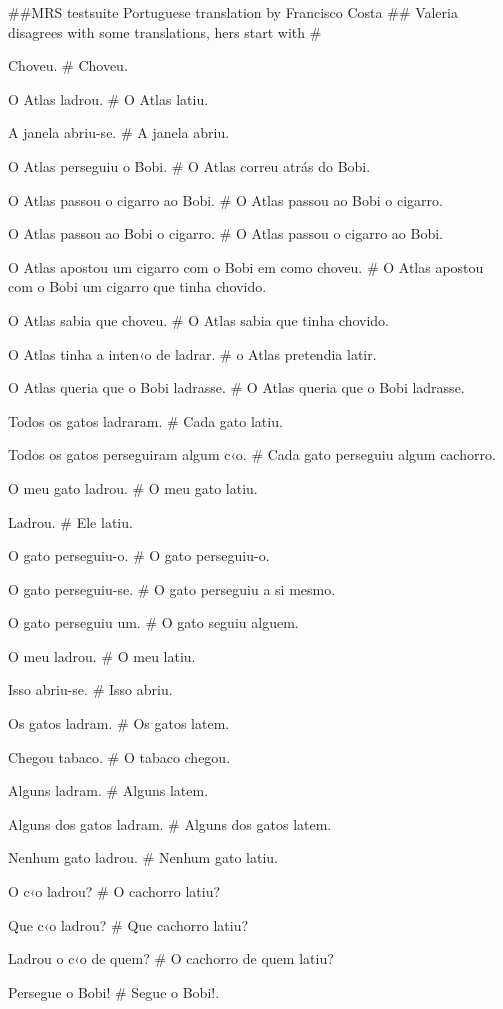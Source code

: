 ##MRS testsuite Portuguese translation by Francisco Costa
## Valeria disagrees with some translations, hers start with #

Choveu.
# Choveu.

O Atlas ladrou.
# O Atlas latiu.

A janela abriu-se.
# A janela abriu.

O Atlas perseguiu o Bobi.
# O Atlas correu atrás do Bobi.

O Atlas passou o cigarro ao Bobi.
# O Atlas passou ao Bobi o cigarro.

O Atlas passou ao Bobi o cigarro.
# O Atlas passou o cigarro ao Bobi.

O Atlas apostou um cigarro com o Bobi em como choveu.
# O Atlas apostou  com o Bobi um cigarro que tinha chovido.

O Atlas sabia que choveu.
# O Atlas sabia que tinha chovido.

O Atlas tinha a inten‹o de ladrar.
# o Atlas pretendia latir.

O Atlas queria que o Bobi ladrasse.
# O Atlas queria que o Bobi ladrasse.

Todos os gatos ladraram.
# Cada gato latiu.

Todos os gatos perseguiram algum c‹o.
# Cada gato perseguiu algum cachorro.

O meu gato ladrou.
# O meu gato latiu.

Ladrou.
# Ele latiu.

O gato perseguiu-o.
# O gato perseguiu-o.

O gato perseguiu-se.
# O gato perseguiu a si mesmo.

O gato perseguiu um.
# O gato seguiu alguem.

O meu ladrou.
# O meu latiu.

Isso abriu-se.
# Isso abriu.

Os gatos ladram.
# Os gatos latem.

Chegou tabaco.
# O tabaco chegou.

Alguns ladram.
# Alguns latem.

Alguns dos gatos ladram.
# Alguns dos gatos latem.

Nenhum gato ladrou.
# Nenhum gato latiu.

O c‹o ladrou?
# O cachorro latiu?

Que c‹o ladrou?
# Que cachorro latiu?

Ladrou o c‹o de quem?
# O cachorro de quem latiu?

Persegue o Bobi!
# Segue o Bobi!.

